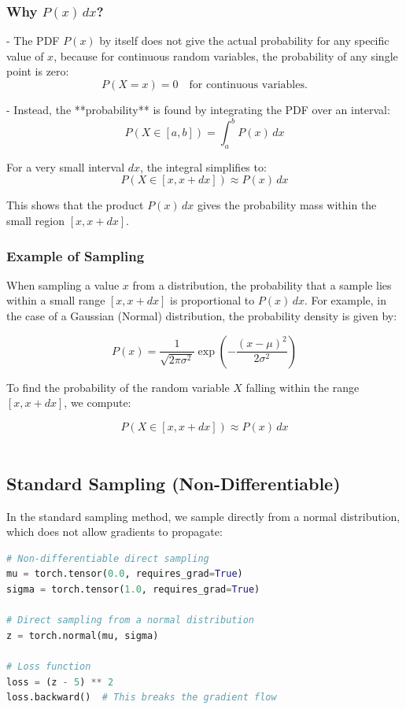 \documentclass{article}
\begin{document}
\subsubsection{Why \( P(x) \, dx \)?}

- The PDF \( P(x) \) by itself does not give the actual probability for any specific value of \( x \), because for continuous random variables, the probability of any single point is zero:
  \[
  P(X = x) = 0 \quad \text{for continuous variables}.
  \]
  
- Instead, the **probability** is found by integrating the PDF over an interval:
  \[
  P(X \in [a, b]) = \int_a^b P(x) \, dx
  \]
  
  For a very small interval \( dx \), the integral simplifies to:
  \[
  P(X \in [x, x + dx]) \approx P(x) \, dx
  \]

This shows that the product \( P(x) \, dx \) gives the probability mass within the small region \( [x, x + dx] \).

\subsubsection{Example of Sampling}

When sampling a value \( x \) from a distribution, the probability that a sample lies within a small range \( [x, x + dx] \) is proportional to \( P(x) \, dx \). For example, in the case of a Gaussian (Normal) distribution, the probability density is given by:

\[
P(x) = \frac{1}{\sqrt{2 \pi \sigma^2}} \exp\left( - \frac{(x - \mu)^2}{2 \sigma^2} \right)
\]

To find the probability of the random variable \( X \) falling within the range \( [x, x + dx] \), we compute:

\[
P(X \in [x, x + dx]) \approx P(x) \, dx
\]\\

\subsection{Standard Sampling (Non-Differentiable)}

In the standard sampling method, we sample directly from a normal distribution, which does not allow gradients to propagate:


\begin{lstlisting}[language=Python]
# Non-differentiable direct sampling
mu = torch.tensor(0.0, requires_grad=True)
sigma = torch.tensor(1.0, requires_grad=True)

# Direct sampling from a normal distribution
z = torch.normal(mu, sigma)

# Loss function
loss = (z - 5) ** 2
loss.backward()  # This breaks the gradient flow
\end{lstlisting}
\end{document}
